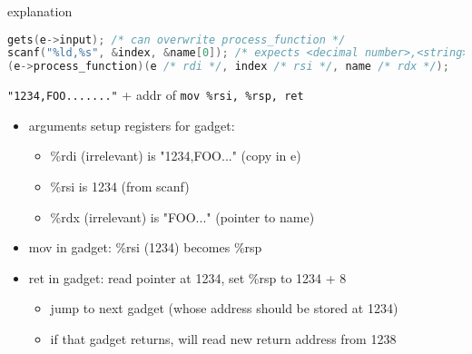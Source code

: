 \iftoggle{heldback}{\excludecomment{soln}}{\includecomment{soln}}
\begin{soln}
\begin{frame}[fragile,label=useFPtrOverwrite1Explain]{explanation}
\begin{lstlisting}[language=C++,style=script]
gets(e->input); /* can overwrite process_function */
scanf("%ld,%s", &index, &name[0]); /* expects <decimal number>,<string> */
(e->process_function)(e /* rdi */, index /* rsi */, name /* rdx */);
\end{lstlisting}
\texttt{"1234,FOO......."} + addr of \texttt{mov \%rsi, \%rsp, ret}
\begin{itemize}
\item arguments setup registers for gadget:
\begin{itemize}
    \item \%rdi (irrelevant) is "1234,FOO..." (copy in e)
    \item \%rsi is 1234 (from scanf)
    \item \%rdx (irrelevant) is "FOO..." (pointer to name)
\end{itemize}
\item mov in gadget: \%rsi (1234) becomes \%rsp
\item ret in gadget: read pointer at 1234, set \%rsp to 1234 + 8
    \begin{itemize}
    \item jump to next gadget (whose address should be stored at 1234)
    \item if that gadget returns, will read new return address from 1238
    \end{itemize}
\end{itemize}
\end{frame}
\end{soln}

